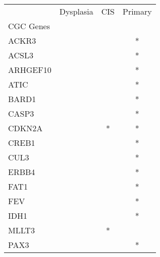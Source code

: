 \begin{tabular}{lccc}
\toprule
{} & Dysplasia & CIS & Primary \\
CGC Genes &           &     &         \\
\midrule
ACKR3     &           &     &       * \\
ACSL3     &           &     &       * \\
ARHGEF10  &           &     &       * \\
ATIC      &           &     &       * \\
BARD1     &           &     &       * \\
CASP3     &           &     &       * \\
CDKN2A    &           &   * &       * \\
CREB1     &           &     &       * \\
CUL3      &           &     &       * \\
ERBB4     &           &     &       * \\
FAT1      &           &     &       * \\
FEV       &           &     &       * \\
IDH1      &           &     &       * \\
MLLT3     &           &   * &         \\
PAX3      &           &     &       * \\
\bottomrule
\end{tabular}

